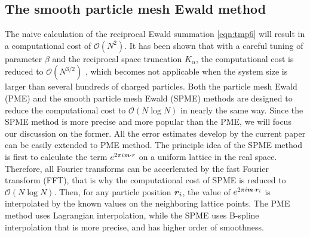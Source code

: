 \documentclass[aps,pre,preprint]{revtex4}
\renewcommand{\v}[1]{\textbf{\textit{#1}}}
\begin{document}


\subsection{The smooth particle mesh Ewald method}

The naive calculation of the reciprocal Ewald summation
\eqref{eqn:tmp6} will result in a computational cost of $\mathcal
O(N^2)$. It has been shown that with a careful tuning of parameter
$\beta$ and the reciprocal space truncation $K_\alpha$, the
computational cost is reduced to $\mathcal O(N^{3/2})$
\cite{perram1988asc}, which becomes not applicable when the system
size is larger than several hundreds of charged particles. Both the
particle mesh Ewald (PME) \cite{darden1993pme} and the smooth particle
mesh Ewald (SPME) \cite{essmann1995spm} methods are designed to reduce
the computational cost to $\mathcal O(N\log N)$ in nearly the same
way.  Since the SPME method is more precise \cite{deserno1998mue1} and
more popular than the PME, we will focus our discussion on the
former. All the error estimates develop by the current paper can be
easily extended to PME method.  The principle idea of the SPME method
is first to calculate the term $e^{2\pi i\v m\cdot\v r}$ on a uniform
lattice in the real space.  Therefore, all Fourier transforms can be
accerlerated by the fast Fourier transform (FFT), that is why the
computational cost of SPME is reduced to $\mathcal O(N\log N)$. Then,
for any particle position $\v r_i$, the value of $e^{2\pi i\v m\cdot\v
  r_i}$ is interpolated by the known values on the neighboring lattice
points.  The PME method uses Lagrangian interpolation, while the SPME
uses B-spline interpolation that is more precise, and has higher order
of smoothness.
\end{document}
